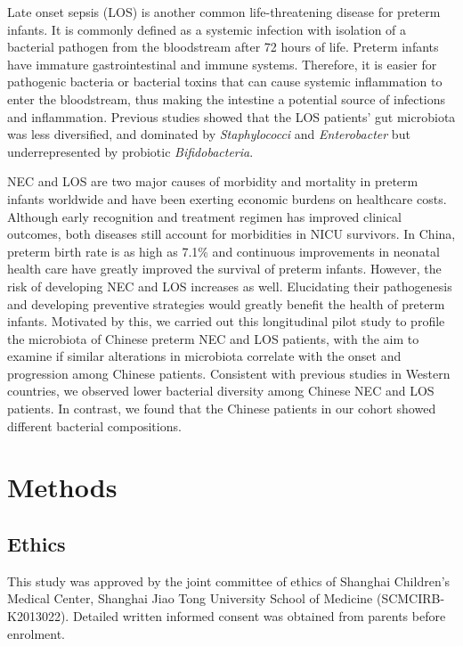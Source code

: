 \documentclass[fleqn,10pt, lineno]{wlpeerj} %
\begin{document}
Late onset sepsis (LOS) is another common life-threatening disease for preterm infants. It is commonly defined as a systemic infection with isolation of a bacterial pathogen from the bloodstream after 72 hours of life\citep{rao2016one, pickering2012red}. Preterm infants have immature gastrointestinal and immune systems. Therefore, it is easier for  pathogenic bacteria or bacterial toxins that can cause systemic inflammation to enter the bloodstream\citep{schwiertz2003development, bezirtzoglou2011microbiota, Cernada2016Sepsis, Sharon2015Gut, korpela2018intestinal}, thus making the intestine a potential source of infections and inflammation. Previous studies showed that the LOS patients' gut microbiota was less diversified, and dominated by \textit{Staphylococci} and \textit{Enterobacter} but underrepresented by probiotic \textit{Bifidobacteria}\citep{madan2012gut,tarr2016gut,Stewart2017Longitudinal,korpela2018intestinal,ficara2018changes}.

NEC and LOS are two major causes of morbidity and mortality in preterm infants worldwide and have been exerting economic burdens on healthcare costs\citep{johnson2013cost,johnson2014economic, mowitz2018cost}. Although early recognition and treatment regimen has improved clinical outcomes, both diseases still account for morbidities in NICU survivors\citep{hintz2005neurodevelopmental, zonnenberg2019neurodevelopmental, shah2015risk}.
In China, preterm birth rate is as high as 7.1\%\citep{blencowe2012national} and continuous improvements in neonatal health care have greatly improved the survival of preterm infants. However, the risk of developing NEC and LOS increases as well. Elucidating their pathogenesis and developing preventive strategies would greatly benefit the health of preterm infants. Motivated by this, we carried out this longitudinal pilot study to profile the microbiota of Chinese preterm NEC and LOS patients, with the aim to examine if similar alterations in microbiota correlate with the onset and progression among Chinese patients.   Consistent with previous studies in Western countries, we observed lower bacterial diversity among Chinese NEC and LOS patients.  In contrast, we found that the Chinese patients in our cohort showed different bacterial compositions.

\section*{Methods}
  \subsection*{Ethics}
  This study was approved by the joint committee of ethics of Shanghai Children’s Medical Center, Shanghai Jiao Tong University School of Medicine (SCMCIRB-K2013022). Detailed written informed consent was obtained from parents before enrolment.
\end{document}

